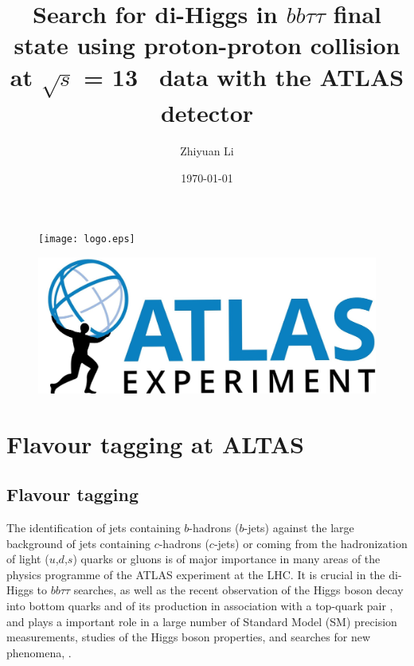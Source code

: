 \documentclass[letterpaper,12pt]{article}
\begin{document}
\title{Search for di-Higgs in $bb\tau\tau$ final state using proton-proton collision at $\sqrt{s}$ = 13 \TeV\ data with the ATLAS detector}%
\author{ Zhiyuan Li}
\date{\today}
\maketitle
\begin{figure}[htp]
\begin{minipage}[b]{.5\textwidth}
\centering
\texttt{[image: logo.eps]}
\end{minipage}\hfill
\begin{minipage}[b]{.45\textwidth}
\vspace{3em}
\centering
\includegraphics[width=1\textwidth]{ATLAS-Logo-Ref-RGB-H_1.jpg}
\end{minipage}
\end{figure}
\newpage


\tableofcontents{}
\printindex{}


\newpage
\section{Flavour tagging at ALTAS}


\subsection{Flavour tagging}


The identification of jets containing $b$-hadrons ($b$-jets) 
against the large background of jets containing $c$-hadrons 
($c$-jets) or coming from the hadronization of light ($u$,$d$,$s$) 
quarks or gluons is of major importance in many areas of the 
physics programme of the ATLAS experiment at the LHC. It is 
crucial in the di-Higgs to $bb\tau\tau$ searches, as well as the recent 
observation of the Higgs boson decay into bottom quarks \cite{HIGG-2018-04} 
and of its production in association with a top-quark pair \cite{HIGG-2018-13}, 
and plays a important role in a large number of Standard Model (SM) 
precision measurements, studies of the Higgs boson properties, and 
searches for new phenomena\cite{SUSY-2014-08}, \cite{ATLAS-CONF-2018-043} \cite{Interpreting Higgs result}.
\end{document}
